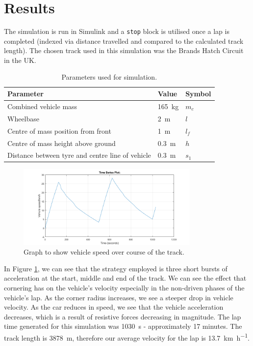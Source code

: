 \documentclass[11pt]{article}
\numberwithin{equation}{section}
\begin{document}
\section{Results}
The simulation is run in Simulink and a \texttt{stop} block is utilised once a lap is completed (indexed via distance travelled and compared to the calculated track length). The chosen track used in this simulation was the Brands Hatch Circuit in the UK.  
\begin{table}[H]
    \centering
    \begin{tabular}{@{}lll@{}}
        \toprule
        Parameter & Value & Symbol \\
        \midrule
        Combined vehicle mass & \SI{165}{\kilo\gram} & $m_c$\\
        Wheelbase & \SI{2}{\meter} & $l$\\
        Centre of mass position from front & \SI{1}{\meter} & $l_f$\\
        Centre of mass height above ground & \SI{0.3}{\meter} & $h$\\
        Distance between tyre and centre line of vehicle & \SI{0.3}{\meter} & $s_1$\\
        \bottomrule
    \end{tabular}
    \caption{Parameters used for simulation.}
\end{table}
\begin{figure}[H]
    \centering
    \includegraphics[width = 0.8\textwidth]{./img/vehSpeed.png}
    \caption{Graph to show vehicle speed over course of the track.}
    \label{vehSpeed}   
\end{figure}
In Figure \ref{vehSpeed}, we can see that the strategy employed is three short bursts of acceleration at the start, middle and end of the track. We can see the effect that cornering has on the vehicle's velocity especially in the non-driven phases of the vehicle's lap. As the corner radius increases, we see a steeper drop in vehicle velocity. As the car reduces in speed, we see that the vehicle acceleration decreases, which is a result of resistive forces decreasing in magnitude. The lap time generated for this simulation was \SI{1030}{\second} - approximately 17 minutes. The track length is \SI{3878}{\meter}, therefore our average velocity for the lap is \SI{13.7}{\kilo\meter\per\hour}.
\end{document}
